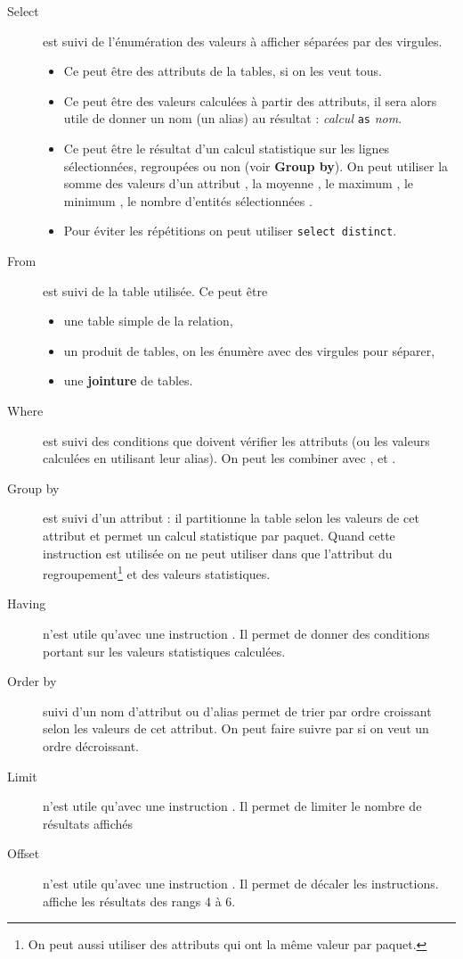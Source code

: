 \begin{description}
    \item[Select] est suivi de l'énumération des valeurs à afficher séparées par des virgules.
    \begin{itemize}
        \item Ce peut être des attributs de la tables, {\bf *} si on les veut tous.
        \item Ce peut être des valeurs calculées à partir des attributs, il sera alors utile de donner un nom (un alias) au résultat : {\it calcul} {\tt as} {\it nom}.
        \item Ce peut être le résultat d'un calcul statistique sur les lignes sélectionnées, regroupées ou non (voir {\bf Group by}). On peut utiliser la somme des valeurs d'un attribut , la moyenne , le maximum , le minimum , le nombre d'entités sélectionnées .
        \item Pour éviter les répétitions on peut utiliser {\tt select distinct}.

    \end{itemize}
    \item[From] est suivi de la table utilisée. Ce peut être
       \begin{itemize}
        \item une table simple de la relation,
        \item un produit de tables, on les énumère avec des virgules pour séparer,
        \item une {\bf jointure} de tables.
    \end{itemize}
    \item[Where] est suivi des conditions que doivent vérifier les attributs (ou les valeurs calculées en utilisant leur alias). On peut les combiner avec ,  et .
    \item[Group by] est suivi d'un attribut : il partitionne la table selon les valeurs de cet attribut et permet un calcul statistique par paquet. Quand cette instruction est utilisée on ne peut utiliser dans  que l'attribut du regroupement\footnote{On peut aussi utiliser des attributs qui ont la même valeur par paquet.} et des valeurs statistiques.
    \item[Having] n'est utile qu'avec une instruction . Il permet de donner des conditions portant sur les valeurs statistiques calculées.
    \item[Order by] suivi d'un nom d'attribut ou d'alias permet de trier par ordre croissant selon les valeurs de cet attribut. On peut faire suivre par  si on veut un ordre décroissant.
    \item[Limit] n'est utile qu'avec une instruction . Il permet de limiter le nombre de résultats affichés
    \item[Offset] n'est utile qu'avec une instruction . Il permet de décaler les instructions.  affiche les résultats des rangs 4 à 6.
\end{description}
